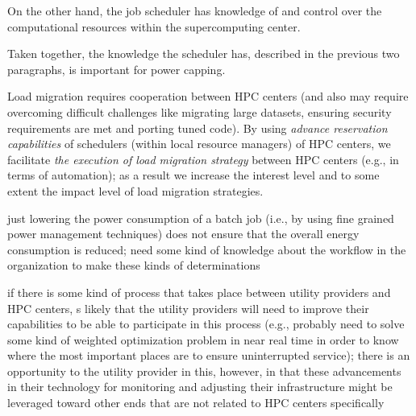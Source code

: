 On the other hand, the job scheduler has knowledge of and control over
the computational resources within the supercomputing center.



Taken together, the knowledge the scheduler has, described in the
previous two paragraphs, is important for power capping.



%
%

Load migration requires cooperation between HPC centers (and also may
require overcoming difficult challenges like migrating large datasets,
ensuring security requirements are met and porting tuned code).  By
using \textit{advance reservation capabilities} of schedulers (within
local resource managers) of HPC centers, we facilitate \textit{the
execution of load migration strategy} between HPC centers (e.g., in
terms of automation); as a result we increase the interest level and
to some extent the impact level of load migration strategies.


just lowering the power consumption of a batch job (i.e., by using
fine grained power management techniques) does not ensure that the
overall energy consumption is reduced; need some kind of knowledge
about the workflow in the organization to make these kinds of
determinations





if there is some kind of process that takes place between utility
providers and HPC centers, s likely that the utility providers will
need to improve their capabilities to be able to participate in this
process (e.g., probably need to solve some kind of weighted
optimization problem in near real time in order to know where the most
important places are to ensure uninterrupted service); there is an
opportunity to the utility provider in this, however, in that these
advancements in their technology for monitoring and adjusting their
infrastructure might be leveraged toward other ends that are not
related to HPC centers specifically





